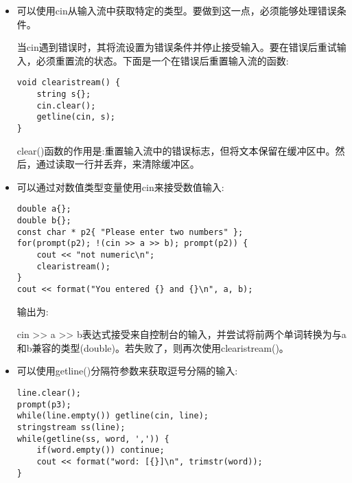 \begin{itemize}
std::getline()函数有三个参数:

\begin{lstlisting}[style=styleCXX]
getline(basic_istream&& in, string& str, char delim );
\end{lstlisting}

第一个参数是输出流，第二个参数是对字符串对象的引用，第三个参数是行结束分隔符。

若未指定，分隔符默认为换行符'\verb|\|n'字符。

我感觉，getline()比cin.getline()方法更方便。

\item 
可以使用cin从输入流中获取特定的类型。要做到这一点，必须能够处理错误条件。

当cin遇到错误时，其将流设置为错误条件并停止接受输入。要在错误后重试输入，必须重置流的状态。下面是一个在错误后重置输入流的函数:

\begin{lstlisting}[style=styleCXX]
void clearistream() {
	string s{};
	cin.clear();
	getline(cin, s);
}
\end{lstlisting}

clear()函数的作用是:重置输入流中的错误标志，但将文本保留在缓冲区中。然后，通过读取一行并丢弃，来清除缓冲区。

\item 
可以通过对数值类型变量使用cin来接受数值输入:

\begin{lstlisting}[style=styleCXX]
double a{};
double b{};
const char * p2{ "Please enter two numbers" };
for(prompt(p2); !(cin >> a >> b); prompt(p2)) {
	cout << "not numeric\n";
	clearistream();
}
cout << format("You entered {} and {}\n", a, b);
\end{lstlisting}

输出为:


cin >{}> a >{}> b表达式接受来自控制台的输入，并尝试将前两个单词转换为与a和b兼容的类型(double)。若失败了，则再次使用clearistream()。

\item 
可以使用getline()分隔符参数来获取逗号分隔的输入:

\begin{lstlisting}[style=styleCXX]
line.clear();
prompt(p3);
while(line.empty()) getline(cin, line);
stringstream ss(line);
while(getline(ss, word, ',')) {
	if(word.empty()) continue;
	cout << format("word: [{}]\n", trimstr(word));
}
\end{lstlisting}


\end{itemize}
